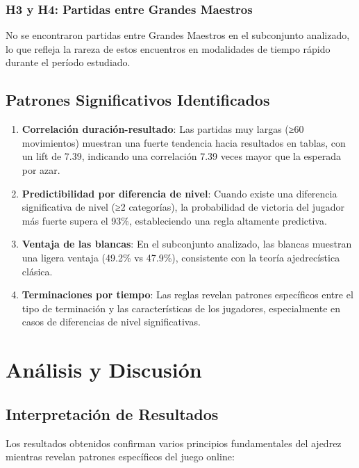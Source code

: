 \documentclass[runningheads]{llncs}
\begin{document}
\subsubsection{H3 y H4: Partidas entre Grandes Maestros}

No se encontraron partidas entre Grandes Maestros en el subconjunto analizado, lo que refleja la rareza de estos encuentros en modalidades de tiempo rápido durante el período estudiado.

\subsection{Patrones Significativos Identificados}

\begin{enumerate}
\item \textbf{Correlación duración-resultado}: Las partidas muy largas (≥60 movimientos) muestran una fuerte tendencia hacia resultados en tablas, con un lift de 7.39, indicando una correlación 7.39 veces mayor que la esperada por azar.

\item \textbf{Predictibilidad por diferencia de nivel}: Cuando existe una diferencia significativa de nivel (≥2 categorías), la probabilidad de victoria del jugador más fuerte supera el 93\%, estableciendo una regla altamente predictiva.

\item \textbf{Ventaja de las blancas}: En el subconjunto analizado, las blancas muestran una ligera ventaja (49.2\% vs 47.9\%), consistente con la teoría ajedrecística clásica.

\item \textbf{Terminaciones por tiempo}: Las reglas revelan patrones específicos entre el tipo de terminación y las características de los jugadores, especialmente en casos de diferencias de nivel significativas.
\end{enumerate}

\section{Análisis y Discusión}

\subsection{Interpretación de Resultados}

Los resultados obtenidos confirman varios principios fundamentales del ajedrez mientras revelan patrones específicos del juego online:
\end{document}
